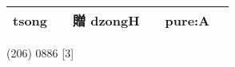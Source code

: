 \documentclass[14pt,a4paper]{scrartcl}
\begin{document}
\begin{longtable}[c]{@{}llllll@{}}
\begin{minipage}[t]{0.14\columnwidth}\raggedright\strut
tsong
\strut\end{minipage} &
\begin{minipage}[t]{0.14\columnwidth}\raggedright\strut
\strut\end{minipage} &
\begin{minipage}[t]{0.14\columnwidth}\raggedright\strut
贈 dzongH
\strut\end{minipage} &
\begin{minipage}[t]{0.14\columnwidth}\raggedright\strut
\strut\end{minipage} &
\begin{minipage}[t]{0.14\columnwidth}\raggedright\strut
pure:A
\strut\end{minipage}\tabularnewline
\bottomrule
\end{longtable}

(206) 0886 {[}3{]}
\end{document}
